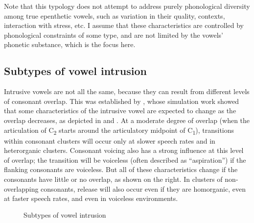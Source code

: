 \documentclass[output=paper,colorlinks,citecolor=brown]{langscibook}
\begin{document}
Note that this typology does not attempt to address purely phonological diversity among true epenthetic vowels, such as variation in their quality, contexts, interaction with stress, etc. I assume that these characteristics are controlled by phonological constraints of some type, and are not limited by the vowels’ phonetic substance, which is the focus here. 

\subsection{Subtypes of vowel intrusion}\label{sec4_1}
Intrusive vowels are not all the same, because they can result from different levels of consonant overlap. This was established by \citet{Gafos2002}, whose simulation work showed that some characteristics of the intrusive vowel are expected to change as the overlap decreases, as depicted in  and . At a moderate degree of overlap (when the articulation of C\textsubscript{2} starts around the articulatory midpoint of C\textsubscript{1}), transitions within consonant clusters will occur only at slower speech rates and in heterorganic clusters. Consonant voicing also has a strong influence at this level of overlap; the transition will be voiceless (often described as “aspiration”) if the flanking consonants are voiceless. But all of these characteristics change if the consonants have little or no overlap, as shown on the right. In clusters of non-overlapping consonants, release will also occur even if they are homorganic, even at faster speech rates, and even in voiceless environments. 


\begin{figure}
\caption{Subtypes of vowel intrusion} \label{fig2}
\end{figure}
\end{document}
